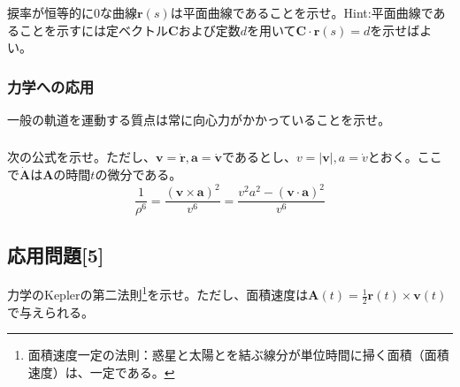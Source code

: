 \documentclass[a4j,dvipdfmx]{jsarticle}
\begin{document}
            \subsubsection{}
                捩率が恒等的に0な曲線$\bm{r}(s)$は平面曲線であることを示せ。{\tiny Hint:平面曲線であることを示すには定ベクトル$\bm{C}$および定数$d$を用いて$\bm{C}\cdot\bm{r}(s)=d$を示せばよい。}
            \subsubsection{力学への応用}
                一般の軌道を運動する質点は常に向心力がかかっていることを示せ。
            \subsubsection{}
                次の公式を示せ。ただし、$\bm{v} = \dot{\bm{r}},\bm{a} = \dot{\bm{v}}$であるとし、$v = |\bm{v}|,a=\dot{v}$とおく。ここで$\dot{\bm{A}}$は$\bm{A}$の時間$t$の微分である。
                \begin{equation*}
                    \frac{1}{\rho^6}=\frac{(\bm{v}\times\bm{a})^2}{v^6} = \frac{v^2a^2-(\bm{v}\cdot{\bm{a}})^2}{v^6}
                \end{equation*}
        \subsection{応用問題[5]}
            力学のKeplerの第二法則\footnote{面積速度一定の法則：惑星と太陽とを結ぶ線分が単位時間に掃く面積（面積速度）は、一定である。}を示せ。ただし、面積速度は$\bm{A}(t)=\frac{1}{2}\bm{r}(t)\times \bm{v}(t)$で与えられる。
\end{document}
